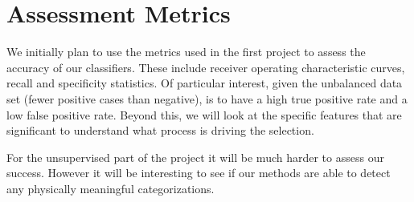\section{Assessment Metrics}
We initially plan to use the metrics used in the first project to assess the accuracy of our classifiers. These include receiver operating characteristic  curves, recall and specificity statistics. Of particular interest, given the unbalanced data set (fewer positive cases than negative), is to have a high true positive rate and a low false positive rate. Beyond this, we will look at the specific features that are significant to understand what process is driving the selection.

For the unsupervised part of the project it will be much harder to assess our success. However it will be interesting to see if our methods are able to detect any physically meaningful categorizations.